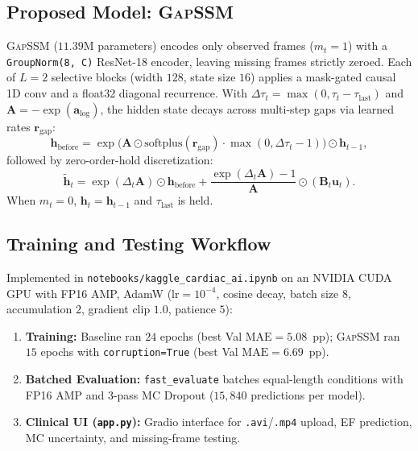 \documentclass[conference]{IEEEtran}
\begin{document}
\subsection{Proposed Model: \textsc{GapSSM}}
\textsc{GapSSM} ($11.39$M parameters) encodes only observed frames ($m_t=1$) with a \texttt{GroupNorm(8, C)} ResNet-18 encoder, leaving missing frames strictly zeroed. Each of $L=2$ selective blocks (width $128$, state size $16$) applies a mask-gated causal 1D conv and a float32 diagonal recurrence. With $\Delta\tau_t = \max(0, \tau_t - \tau_{\text{last}})$ and $\mathbf{A} = -\exp(\mathbf{a}_{\log})$, the hidden state decays across multi-step gaps via learned rates $\mathbf{r}_{\text{gap}}$:
\begin{equation}
    \mathbf{h}_{\text{before}} = \exp\bigl(\mathbf{A} \odot \text{softplus}(\mathbf{r}_{\text{gap}}) \cdot \max(0, \Delta\tau_t - 1)\bigr) \odot \mathbf{h}_{t-1},
\end{equation}
followed by zero-order-hold discretization:
\begin{equation}
    \tilde{\mathbf{h}}_t = \exp(\Delta_t \mathbf{A}) \odot \mathbf{h}_{\text{before}} + \frac{\exp(\Delta_t \mathbf{A}) - 1}{\mathbf{A}} \odot (\mathbf{B}_t \mathbf{u}_t).
\end{equation}
When $m_t=0$, $\mathbf{h}_t = \mathbf{h}_{t-1}$ and $\tau_{\text{last}}$ is held.

\subsection{Training and Testing Workflow}
Implemented in \texttt{notebooks/kaggle\_cardiac\_ai.ipynb} on an NVIDIA CUDA GPU with FP16 AMP, AdamW ($\text{lr}=10^{-4}$, cosine decay, batch size $8$, accumulation $2$, gradient clip $1.0$, patience $5$):
\begin{enumerate}
    \item \textbf{Training:} Baseline ran $24$ epochs (best Val $\text{MAE}=5.08$~pp); \textsc{GapSSM} ran $15$ epochs with \texttt{corruption=True} (best Val $\text{MAE}=6.69$~pp).
    \item \textbf{Batched Evaluation:} \texttt{fast\_evaluate} batches equal-length conditions with FP16 AMP and $3$-pass MC Dropout ($15,840$ predictions per model).
    \item \textbf{Clinical UI (\texttt{app.py}):} Gradio interface for \texttt{.avi}/\texttt{.mp4} upload, EF prediction, MC uncertainty, and missing-frame testing.
\end{enumerate}
\end{document}
